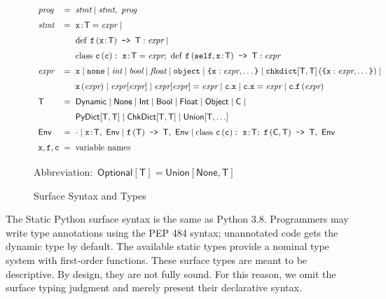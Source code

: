 \documentclass[english,cleveref,submission]{programming}
\makeatletter
\newcommand{\SP}{Static Python}
\newcommand{\code}[1]{\texttt{#1}}
\newcommand{\defeq}{=}
\newcommand{\langmid}{\mid} %
\newenvironment{langarray}{\(\def\arraystretch{1.5}\begin{array}{l@{\hspace{2mm}}c@{\hspace{2mm}}l}}{\end{array}\)}
\newcommand{\spapp}[2]{#1\,(#2)}
\newcommand{\spann}[2]{#1\!:\!#2}
\newcommand{\typefont}[1]{\mathsf{#1}}
\newcommand{\codefont}[1]{\emph{#1}}
\newcommand{\paramtype}[2]{#1[#2]}
\newcommand{\sptype}{\typefont{T}}
\newcommand{\sptclass}{\typefont{C}}
\newcommand{\sptint}{\typefont{Int}}
\newcommand{\sptbool}{\typefont{Bool}}
\newcommand{\sptfloat}{\typefont{Float}}
\newcommand{\sptdyn}{\typefont{Dynamic}}
\newcommand{\sptobject}{\typefont{Object}}
\newcommand{\sptnone}{\typefont{None}}
\newcommand{\sptoptional}[1]{\paramtype{\typefont{Optional}}{#1}}
\newcommand{\sptunion}[1]{\paramtype{\typefont{Union}}{#1}}
\newcommand{\sptrawpydict}{\typefont{PyDict}}
\newcommand{\sptpydict}[2]{\paramtype{\sptrawpydict}{#1, #2}}
\newcommand{\sptchkdict}[2]{\paramtype{\typefont{ChkDict}}{#1, #2}}
\newcommand{\sptenv}{\typefont{Env}}
\newcommand{\sptenvnil}{\cdot}
\newcommand{\sptvardef}[2]{\spann{#1}{#2}}
\newcommand{\sptfundef}[3]{\spapp{#1}{#2}\code{ -> }#3}
\newcommand{\sptclassdef}[4]{\mathrm{class}~\spapp{#1}{#2}:~#3;~#4}
\newcommand{\spx}{\code{x}}
\newcommand{\spf}{\code{f}}
\newcommand{\spc}{\code{c}}
\newcommand{\spprog}{\codefont{prog}}
\newcommand{\spstmt}{\codefont{stmt}}
\newcommand{\spexpr}{\codefont{expr}}
\newcommand{\spvardef}[3]{\sptvardef{#1}{#2} = #3}
\newcommand{\spfundef}[4]{\mathrm{def}~\spapp{#1}{#2}\code{ -> }#3: #4}
\newcommand{\spclassdef}[4]{\mathrm{class}~\spapp{#1}{#2}:~#3;~#4}
\newcommand{\spself}{\code{self}}
\newcommand{\spobject}{\code{object}}
\newcommand{\spnone}{\code{none}}
\newcommand{\spint}{\codefont{int}}
\newcommand{\spbool}{\codefont{bool}}
\newcommand{\spfloat}{\codefont{float}}
\newcommand{\sppydict}[1]{\code{\{}#1\code{\}}}
\newcommand{\spchkdict}[3]{\spapp{\paramtype{\code{chkdict}}{#1, #2}}{#3}}
\newcommand{\spdictref}[2]{#1[#2]}
\newcommand{\spdictset}[3]{\spdictref{#1}{#2} = #3}
\newcommand{\spobjref}[2]{#1.#2}
\newcommand{\spobjset}[3]{\spobjref{#1}{#2} = #3}
\newcommand{\spobjapp}[3]{\spobjref{#1}{\spapp{#2}{#3}}}
\makeatother
\begin{document}
\begin{figure}[t]
  \begin{langarray}
    \spprog & \defeq &
      \spstmt \langmid \spstmt,~\spprog
  \\
    \spstmt & \defeq &
      \spvardef{\spx}{\sptype}{\spexpr} \langmid
  \\ & &
      \spfundef{\spf}{\spann{\spx}{\sptype}}{\sptype}{\spexpr} \langmid
  \\ & &
      \spclassdef{\spc}{\spc}{\spvardef{\spx}{\sptype}{\spexpr}}{\spfundef{\spf}{\spself, \spann{\spx}{\sptype}}{\sptype}{\spexpr}}
  \\
    \spexpr & \defeq &
      \spx \langmid \spnone \langmid \spint \langmid \spbool \langmid \spfloat \langmid \spobject \langmid
      \sppydict{\spx: \spexpr, \ldots} \langmid
      \spchkdict{\sptype}{\sptype}{\sppydict{\spx: \spexpr, \ldots}} \langmid
  \\ & &
      \spapp{\spx}{\spexpr} \langmid
      \spdictref{\spexpr}{\spexpr} \langmid
      \spdictset{\spexpr}{\spexpr}{\spexpr} \langmid
      \spobjref{\spc}{\spx} \langmid
      \spobjset{\spc}{\spx}{\spexpr} \langmid
      \spobjapp{\spc}{\spf}{\spexpr}
  \\
    \sptype & \defeq &
      \sptdyn \langmid
      \sptnone \langmid
      \sptint \langmid
      \sptbool \langmid
      \sptfloat \langmid
      \sptobject \langmid
      \sptclass \langmid
  \\ & &
      \sptpydict{\sptype}{\sptype} \langmid
      \sptchkdict{\sptype}{\sptype} \langmid
      \sptunion{\sptype, \ldots}
  \\
    \sptenv & \defeq &
      \sptenvnil \langmid
      \sptvardef{\spx}{\sptype},~\sptenv \langmid
      \sptfundef{\spf}{\sptype}{\sptype},~\sptenv \langmid
      \sptclassdef{\spc}{\spc}{\sptvardef{\spx}{\sptype}}{\sptfundef{\spf}{\sptclass, \sptype}{\sptype}},~\sptenv
  \\
    \spx, \spf, \spc & \defeq & \mbox{variable names}
  \end{langarray}

  \bigskip
  \mbox{Abbreviation: $\sptoptional{\sptype} \defeq \sptunion{\sptnone, \sptype}$}

  \caption{Surface Syntax and Types}
  \label{f:surface-types}
\end{figure}

The \SP{} surface syntax is the same as Python 3.8.
Programmers may write type annotations using the PEP 484 syntax;
unannotated code gets the dynamic type by default.
The available static types provide a nominal type system with first-order functions.
These surface types are meant to be descriptive.
By design, they are not fully sound.
For this reason, we omit the surface typing judgment and merely present their
declarative syntax.
\end{document}
